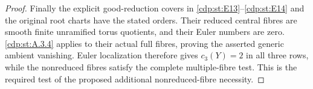 \begin{proof}
Finally the explicit good-reduction covers in \ref{cdp:st:E13}--\ref{cdp:st:E14}
and the original root charts have the stated orders.
Their reduced central fibres are smooth finite unramified
torus quotients, and their Euler numbers are zero.
\ref{cdp:st:A.3.4} applies to their actual full fibres, proving the
asserted generic ambient vanishing. Euler localization
therefore gives $c_3(Y)=2$ in all three rows, while the
nonreduced fibres satisfy the complete multiple-fibre
test. This is the required test of the proposed additional
nonreduced-fibre necessity.
\end{proof}
